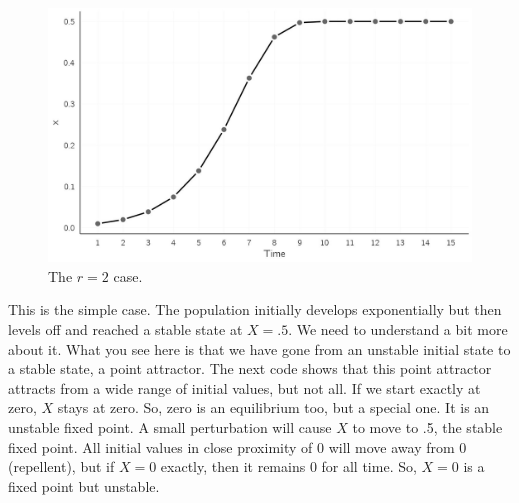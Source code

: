 \documentclass[
  a4paper,
  DIV=11,
  numbers=noendperiod,
  oneside]{scrreprt}
\begin{document}
\begin{figure}

{\centering \includegraphics{media/ch2/fig-ch2-img2.jpg}

}

\caption{\label{fig-ch2-img2}The \(r=2\) case.}

\end{figure}

This is the simple case. The population initially develops exponentially
but then levels off and reached a stable state at \(X = .5\). We need to
understand a bit more about it. What you see here is that we have gone
from an unstable initial state to a stable state, a point attractor. The
next code shows that this point attractor attracts from a wide range of
initial values, but not all. If we start exactly at zero, \(X\) stays at
zero. So, zero is an equilibrium too, but a special one. It is an
unstable fixed point. A small perturbation will cause \(X\) to move to
.5, the stable fixed point. All initial values in close proximity of 0
will move away from 0 (repellent), but if \(X = 0\) exactly, then it
remains 0 for all time. So, \(X = 0\) is a fixed point but unstable.
\end{document}
